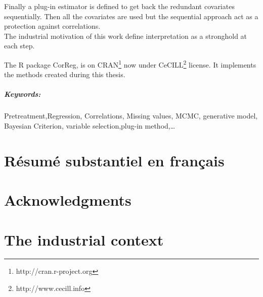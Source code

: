 \documentclass[12pt,a4paper]{report}
\begin{document}
	Finally a plug-in estimator is defined to get back the redundant covariates sequentially. Then all the covariates are used but the sequential approach act as a protection against correlations.
\\

	The industrial motivation of this work define interpretation as a stronghold at each step. 	
	
	The R package CorReg, is on CRAN\footnote{http://cran.r-project.org} now under CeCILL\footnote{http://www.cecill.info} license. It implements the methods created during this thesis.
	
	 	
\paragraph{Keywords:} Pretreatment,Regression, Correlations, Missing values, MCMC, generative model, Bayesian Criterion, variable selection,plug-in method,\dots
\chapter*{Résumé substantiel en français}
	
\chapter*{Acknowledgments}






\tableofcontents

\chapter{The industrial context}
\end{document}
